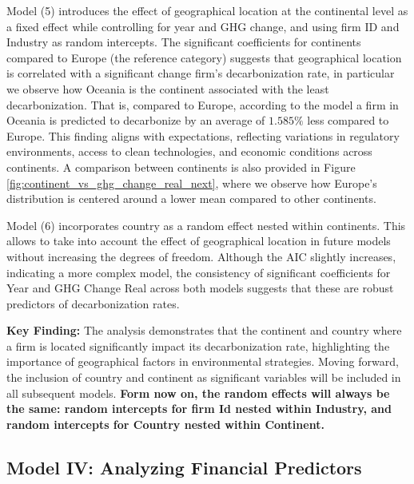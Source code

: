 Model (5) introduces the effect of geographical location at the continental level as a fixed effect while controlling for year and GHG change, and using firm ID and Industry as random intercepts. The significant coefficients for continents compared to Europe (the reference category) suggests that geographical location is correlated with a significant change firm's decarbonization rate, in particular we observe how Oceania is the continent associated with the least decarbonization. That is, compared to Europe, according to the model a firm in Oceania is predicted to decarbonize by an average of $1.585 \%$ less compared to Europe. This finding aligns with expectations, reflecting variations in regulatory environments, access to clean technologies, and economic conditions across continents. A comparison between continents is also provided in Figure \ref{fig:continent_vs_ghg_change_real_next}, where we observe how Europe's distribution is centered around a lower mean compared to other continents. 


Model (6) incorporates country as a random effect nested within continents. This allows to take into account the effect of geographical location in future models without increasing the degrees of freedom. Although the AIC slightly increases, indicating a more complex model, the consistency of significant coefficients for Year and GHG Change Real across both models suggests that these are robust predictors of decarbonization rates.


\textbf{Key Finding:} The analysis demonstrates that the continent and country where a firm is located significantly impact its decarbonization rate, highlighting the importance of geographical factors in environmental strategies. Moving forward, the inclusion of country and continent as significant variables will be included in all subsequent models. \textbf{Form now on, the random effects will always be the same: random intercepts for firm Id nested within Industry, and random intercepts for Country nested within Continent.} 


 

\subsection{Model IV: Analyzing Financial Predictors}


